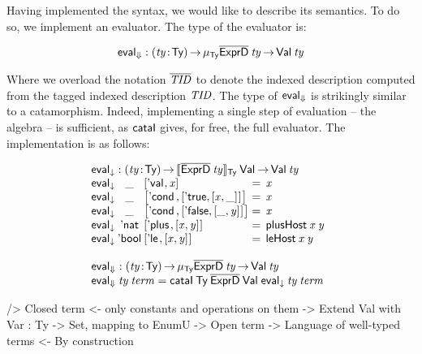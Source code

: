 Having implemented the syntax, we would like to describe its
semantics. To do so, we implement an evaluator. The type of the
evaluator is:

\[
\evalH : \PI{\V{ty}}{\Ty} 
         \IMu{\Ty}{\toIDesc{\HExprD}}{\V{ty}} \To
         \Val{\V{ty}}
\]


Where we overload the notation $\toIDesc{\V{TID}}$ to denote the
indexed description computed from the tagged indexed description
$\V{TID}$. The type of $\evalH$ is strikingly similar to a
catamorphism. Indeed, implementing a single step of evaluation -- the
algebra -- is sufficient, as $\F{cataI}$ gives, for free, the full
evaluator. The implementation is as follows:


\[\stk{
\evalOne : \PI{\V{ty}}{\Ty} \idescop{\toIDesc{\HExprD}\:\V{ty}}{\Ty}{\Val{\!}}
           \To {\Val{\V{ty}}} \\
\begin{array}{@{}l@{}c@{}l@{\:=\:\:}l}
\evalOne\: & \_\: & \pair{\Eval{\!}}{\V{x}}{}                                             & \V{x} \\
\evalOne\: & \_\: & \pair{\Econd{\!}{\!}{\!}}{\pair{\BoolTrue}{\pair{\V{x}}{\_}{}}{}}{}   & \V{x} \\
\evalOne\: & \_\: & \pair{\Econd{\!}{\!}{\!}}{\pair{\BoolFalse}{\pair{\_}{\V{y}}{}}{}}{}  & \V{x} \\
\evalOne\: & \Enat\: & \pair{\Eplus{\!}{\!}}{\pair{\V{x}}{\V{y}}{}}{}                     & \F{plusHost}\: \V{x}\: \V{y} \\
\evalOne\: & \Ebool\: & \pair{\Ele{\!}{\!}}{\pair{\V{x}}{\V{y}}{}}{}                      & \F{leHost}\: \V{x}\: \V{y} 
\end{array} \\
\\
\evalH : \PI{\V{ty}}{\Ty} 
           \IMu{\Ty}{\toIDesc{\HExprD}}{\V{ty}} \To
           \Val{\V{ty}} \\
\evalH\: \V{ty}\: \V{term} = \F{cataI}\: \Ty\: 
                                 \toIDesc{\HExprD}\: 
                                 \Val{\!}\: 
                                 \evalOne\: 
                                 \V{ty}\: 
                                 \V{term}
}\]

\begin{wstructure}
    /> Closed term
        <- only constants and operations on them
        -> Extend Val with Var : Ty -> Set, mapping to EnumU
            -> Open term
            -> Language of well-typed terms
                <- By construction
\end{wstructure}

